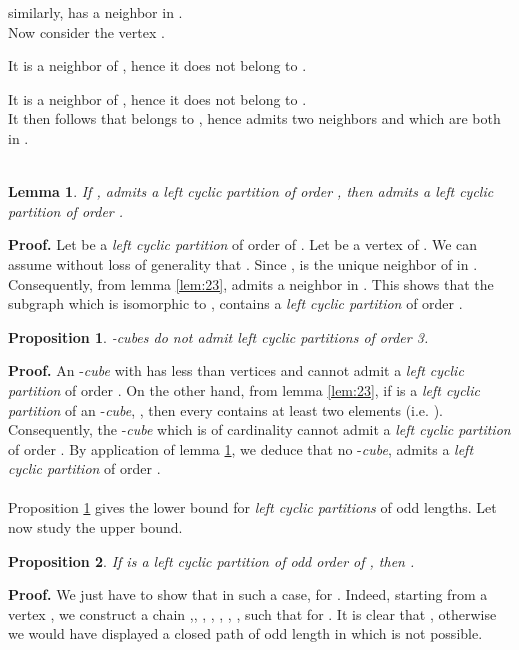 \documentclass{article}
\newtheorem{lemma}{Lemma}
\newtheorem{proposition}{Proposition}
\begin{document}
 similarly,   has a neighbor
 in . \\
Now consider the vertex . 

 It is a neighbor of , hence it does not belong to .

 It is a neighbor of , hence it does not belong to .\\
It then follows that  belongs to , hence  admits two
neighbors  and  which are both in .\\
\\

\begin{lemma} \label{lem:3rec}
If ,  admits a {\em left cyclic partition} of order , then 
 admits a {\em left cyclic partition} of order .
\end{lemma}
{\bf Proof.} Let  be a {\em left cyclic partition} of order  of 
. Let  be a vertex of . We can assume without loss of generality
that . Since , 
 is the unique neighbor of  in . Consequently, from lemma \ref{lem:23},  admits a neighbor in . This shows that the
subgraph  which is isomorphic to , contains a {\em left
  cyclic partition} of order .\\



\begin{proposition}  \label{prop:pas3}
-cubes do not  admit left cyclic partitions of order 3. 
\end{proposition}
{\bf Proof.} An -{\em cube} with  has less than  vertices and
 cannot admit a {\em left cyclic partition} of order . On the other hand,
 from lemma \ref{lem:23}, if  is a {\em left cyclic partition} of
 an -{\em cube}, , then every  contains at least two elements
 (i.e. ). Consequently, the -{\em cube}  which is of
 cardinality  cannot admit a {\em left cyclic partition} of order . By application of lemma
 \ref{lem:3rec}, we deduce that no -{\em cube},  admits a {\em left
 cyclic partition} of order .\\
 
\\
Proposition \ref{prop:pas3} gives the lower bound for {\em left cyclic partitions} of odd lengths. 
Let now study the upper bound.
\begin{proposition}   \label{prop:ibound}
If  is a left cyclic partition of odd order  of , then 
. 
\end{proposition}
{\bf Proof.} We just have to show that in such a case,   
 for . Indeed, starting from a vertex , 
we construct a chain ,, , 
, , , ,  such 
that  for . It is clear that , otherwise 
we would have displayed a closed path of odd length in  which is not
possible.\\
 
\end{document}
